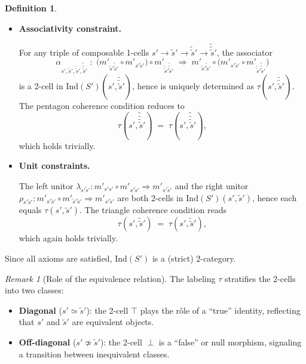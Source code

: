 \documentclass[a4paper,10pt]{article}
\theoremstyle{plain}
\theoremstyle{definition}
\newtheorem{definition}[theorem]{Definition}
\theoremstyle{remark}
\newtheorem{remark}[theorem]{Remark}
\newcommand{\Top}{\top}
\newcommand{\Bot}{\perp}
\newcommand{\vsim}{\simeq}
\newcommand{\cmp}{\circ}
\newcommand{\cc}[2]{m'_{#1 #2}}
\begin{document}
\begin{definition}
\begin{itemize}
       \item \textbf{Associativity constraint.}

          For any triple of composable 1-cells
          $s' \to \tilde{s}' \to \tilde{\tilde{s}}' \to \tilde{\tilde{\tilde{s}}}'$, the associator
          \[
            \alpha_{s',\tilde{s}',\tilde{\tilde{s}}',\tilde{\tilde{\tilde{s}}}'}
            \;:\;
            \bigl(\cc{\tilde{s}'}{\tilde{\tilde{s}}'} \cmp \cc{s'}{\tilde{s}'}\bigr) \cmp \cc{\tilde{\tilde{s}}'}{ \tilde{\tilde{\tilde{s}}}'}
            \;\Rightarrow\;
            \cc{\tilde{s}'}{\tilde{\tilde{s}}'} \cmp \bigl(\cc{s'}{\tilde{s}'} \cmp \cc{\tilde{\tilde{s}}'}{\tilde{\tilde{\tilde{s}}}'}\bigr)
          \]
          is a 2-cell in $\mathrm{Ind}(S')(s',\tilde{\tilde{\tilde{s}}}')$, hence is uniquely determined as $\tau(s', \tilde{\tilde{\tilde{s}}}')$.
          The pentagon coherence condition reduces to
          \[
            \tau(s', \tilde{\tilde{\tilde{\tilde{s}}}}') \;=\; \tau(s', \tilde{\tilde{\tilde{\tilde{s}}}}'),
          \]
          which holds trivially.

    \item \textbf{Unit constraints.}

          The left unitor $\lambda_{s'\tilde{s}'} : \cc{s'}{s'} \cmp \cc{s'}{\tilde{s}'}
            \Rightarrow \cc{s'}{\tilde{s}'}$ and the right unitor
          $\rho_{s'\tilde{s}'} : \cc{s'}{\tilde{s}'} \cmp \cc{\tilde{s}'}{\tilde{s}'}
            \Rightarrow \cc{s'}{\tilde{s}'}$ are both 2-cells in $\mathrm{Ind}(S')(s',\tilde{s}')$,
          hence each equals $\tau(s', \tilde{s}')$. The triangle coherence condition
          reads
          \[
            \tau(s', \tilde{\tilde{s}}') \;=\; \tau(s', \tilde{\tilde{s}}'),
          \]
          which again holds trivially.

  \end{itemize}

    Since all axioms are satisfied, $\mathrm{Ind}(S')$ is a (strict) 2-category.
\end{definition}

\begin{remark}[Role of the equivalence relation]
  The labeling $\tau$ stratifies the 2-cells into two classes:
  \begin{itemize}
    \item \textbf{Diagonal} ($s' \vsim \tilde{s}'$): the 2-cell $\Top$ plays the
          rôle of a ``true'' identity, reflecting that $s'$ and $\tilde{s}'$ are
          equivalent objects.
    \item \textbf{Off-diagonal} ($s' \not\vsim \tilde{s}'$): the 2-cell $\Bot$
          is a ``false'' or null morphism, signaling a transition between
          inequivalent classes.
  \end{itemize}
\end{remark}
\end{document}
